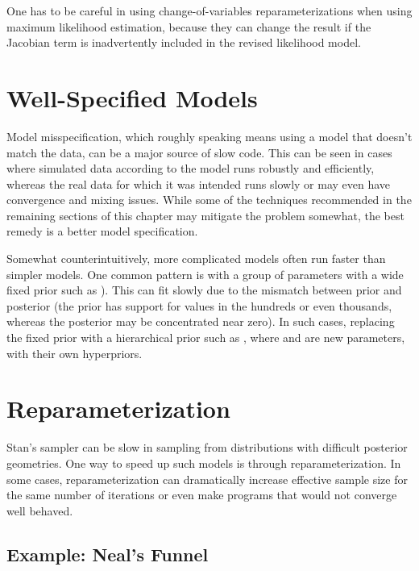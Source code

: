 One has to be careful in using change-of-variables reparameterizations
when using maximum likelihood estimation, because they can change the
result if the Jacobian term is inadvertently included in the revised
likelihood model.


\section{Well-Specified Models}

Model misspecification, which roughly speaking means using a model
that doesn't match the data, can be a major source of slow code.  This
can be seen in cases where simulated data according to the model runs
robustly and efficiently, whereas the real data for which it was
intended runs slowly or may even have convergence and mixing issues.
While some of the techniques recommended in the remaining sections of
this chapter may mitigate the problem somewhat, the best remedy is a
better model specification.  

Somewhat counterintuitively, more complicated models often run faster
than simpler models.  One common pattern is with a group of parameters
with a wide fixed prior such as ).  This can fit
slowly due to the mismatch between prior and posterior (the prior has
support for values in the hundreds or even thousands, whereas the
posterior may be concentrated near zero).  In such cases, replacing
the fixed prior with a hierarchical prior such as , where  and  are new parameters, with
their own hyperpriors.


\section{Reparameterization}\label{reparameterization.section}

Stan's sampler can be slow in sampling from distributions with
difficult posterior geometries.  One way to speed up such models is
through reparameterization.  In some cases, reparameterization can
dramatically increase effective sample size for the same number of
iterations or even make programs that would not converge well
behaved. 

\subsection{Example: Neal's Funnel}

